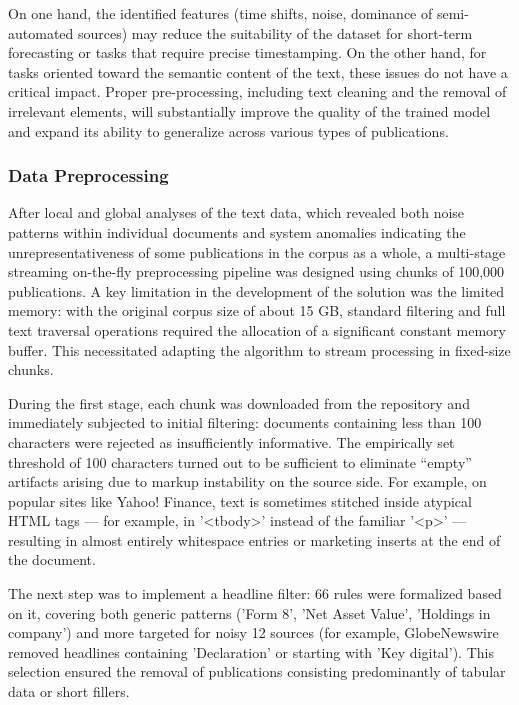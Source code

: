 On one hand, the identified features (time shifts, noise, dominance of semi-automated sources) may reduce the suitability of the dataset
for short-term forecasting or tasks that require precise timestamping. On the other hand, for tasks oriented toward the semantic content
of the text, these issues do not have a critical impact. Proper pre-processing, including text cleaning and the removal of irrelevant
elements, will substantially improve the quality of the trained model and expand its ability to generalize across various types of publications.

\subsubsection{Data Preprocessing}
\label{sec:data_prep}
After local and global analyses of the text data, which revealed both noise patterns within individual documents and system anomalies
indicating the unrepresentativeness of some publications in the corpus as a whole, a multi-stage streaming on-the-fly preprocessing
pipeline was designed using chunks of 100,000 publications. A key limitation in the development of the solution was the limited
memory: with the original corpus size of about 15 GB, standard filtering and full text traversal operations required the allocation
of a significant constant memory buffer. This necessitated adapting the algorithm to stream processing in fixed-size chunks.

During the first stage, each chunk was downloaded from the repository and immediately subjected to initial filtering: documents
containing less than 100 characters were rejected as insufficiently informative. The empirically set threshold of 100 characters
turned out to be sufficient to eliminate “empty” artifacts arising due to markup instability on the source side. For example,
on popular sites like Yahoo! Finance, text is sometimes stitched inside atypical HTML tags — for example, in '<tbody>' instead
of the familiar '<p>' — resulting in almost entirely whitespace entries or marketing inserts at the end of the document.

The next step was to implement a headline filter: 66 rules were formalized based on it, covering both generic patterns ('Form 8',
'Net Asset Value', 'Holdings in company') and more targeted for noisy 12 sources (for example, GlobeNewswire removed headlines
containing 'Declaration' or starting with 'Key digital'). This selection ensured the removal of publications consisting
predominantly of tabular data or short fillers.

